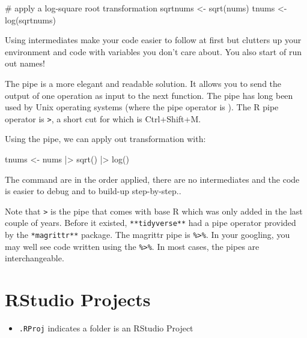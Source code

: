 \documentclass[
  letterpaper,
  DIV=11,
  numbers=noendperiod]{scrreprt}
\newenvironment{Shaded}{\begin{snugshade}}{\end{snugshade}}
\newcommand{\CommentTok}[1]{\textcolor[rgb]{0.37,0.37,0.37}{#1}}
\newcommand{\FunctionTok}[1]{\textcolor[rgb]{0.28,0.35,0.67}{#1}}
\newcommand{\NormalTok}[1]{\textcolor[rgb]{0.00,0.23,0.31}{#1}}
\newcommand{\OtherTok}[1]{\textcolor[rgb]{0.00,0.23,0.31}{#1}}
\newcommand{\SpecialCharTok}[1]{\textcolor[rgb]{0.37,0.37,0.37}{#1}}
\providecommand{\tightlist}{%
  \setlength{\itemsep}{0pt}\setlength{\parskip}{0pt}}\usepackage{longtable,booktabs,array}
\begin{document}
\begin{Shaded}
\begin{Highlighting}[]
\CommentTok{\# apply a log{-}square root transformation}
\NormalTok{sqrtnums }\OtherTok{\textless{}{-}} \FunctionTok{sqrt}\NormalTok{(nums)}
\NormalTok{tnums }\OtherTok{\textless{}{-}} \FunctionTok{log}\NormalTok{(sqrtnums)}
\end{Highlighting}
\end{Shaded}

Using intermediates make your code easier to follow at first but
clutters up your environment and code with variables you don't care
about. You also start of run out names!

The pipe is a more elegant and readable solution. It allows you to send
the output of one operation as input to the next function. The pipe has
long been used by Unix operating systems (where the pipe operator is
\texttt{\textbar{}}). The R pipe operator is
\texttt{\textbar{}\textgreater{}}, a short cut for which is
Ctrl+Shift+M.

Using the pipe, we can apply out transformation with:

\begin{Shaded}
\begin{Highlighting}[]
\NormalTok{tnums }\OtherTok{\textless{}{-}}\NormalTok{ nums }\SpecialCharTok{|\textgreater{}} 
  \FunctionTok{sqrt}\NormalTok{() }\SpecialCharTok{|\textgreater{}} 
  \FunctionTok{log}\NormalTok{()}
\end{Highlighting}
\end{Shaded}

The command are in the order applied, there are no intermediates and the
code is easier to debug and to build-up step-by-step..

Note that \texttt{\textbar{}\textgreater{}} is the pipe that comes with
base R which was only added in the last couple of years. Before it
existed, \texttt{**tidyverse**} had a pipe operator provided by the
\texttt{*magrittr**} package. The magrittr pipe is
\texttt{\%\textgreater{}\%}. In your googling, you may well see code
written using the \texttt{\%\textgreater{}\%}. In most cases, the pipes
are interchangeable.

\hypertarget{rstudio-projects}{%
\section{RStudio Projects}\label{rstudio-projects}}

\begin{itemize}
\tightlist
\item
  \texttt{.RProj} indicates a folder is an RStudio Project
\end{itemize}
\end{document}

